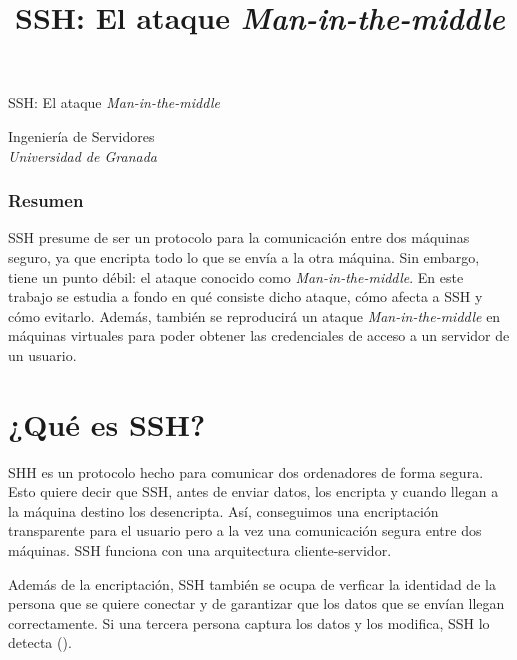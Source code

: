 \documentclass[10pt,a4paper,spanish]{article}
\title{\Huge SSH: El ataque \textit{Man-in-the-middle}}
\begin{document}
\begin{center}
{\Huge SSH: El ataque \textit{Man-in-the-middle}}\\[0.5cm]
\end{center}
{\large Ingeniería de Servidores}\\[0.5cm]
{\large \textit{Universidad de Granada}}
\begin{center}
\subsubsection*{Resumen}
\begin{minipage}{0.7\textwidth}
{\small SSH presume de ser un protocolo para la comunicación entre dos máquinas seguro, ya que encripta todo lo que se envía a la otra máquina. Sin embargo, tiene un punto débil: el ataque conocido como \textit{Man-in-the-middle}. En este trabajo se estudia a fondo en qué consiste dicho ataque, cómo afecta a SSH y cómo evitarlo. Además, también se reproducirá un ataque \textit{Man-in-the-middle} en máquinas virtuales para poder obtener las credenciales de acceso a un servidor de un usuario.}
\end{minipage}
\end{center}

\section{¿Qué es SSH?}
SHH es un protocolo hecho para comunicar dos ordenadores de forma segura. Esto quiere decir que SSH, antes de enviar datos, los encripta y cuando llegan a la máquina destino los desencripta. Así, conseguimos una encriptación transparente para el usuario pero a la vez una comunicación segura entre dos máquinas. SSH funciona con una arquitectura cliente-servidor.

Además de la encriptación, SSH también se ocupa de verficar la identidad de la persona que se quiere conectar y de garantizar que los datos que se envían llegan correctamente. Si una tercera persona captura los datos y los modifica, SSH lo detecta (\cite{sshbiblio}).
\end{document}
